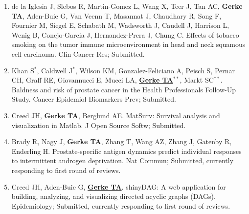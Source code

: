 \documentclass[11pt, a4paper]{article} %
\begin{document}
\begin{enumerate}[leftmargin=*]
\item{} de la Iglesia J, Slebos R, Martin-Gomez L, Wang X, Teer J, Tan AC, {\bf Gerke TA}, Aden-Buie G, Van Veenn T, Masannat J, Chaudhary R, Song F, Fournier M, Siegel E, Schabath M, Wadsworth J, Caudell J, Harrison L, Wenig B, Conejo-Garcia J, Hernandez-Prera J, Chung C. Effects of tobacco smoking on the tumor immune microenvironment in head and neck squamous cell carcinoma. Clin Cancer Res; Submitted.

\item{} Khan S$^*$, Caldwell J$^*$, Wilson KM, Gonzalez-Feliciano A, Peisch S, Pernar CH, Graff RE, Giovannucci E, Mucci LA, \underline{{\bf Gerke TA$^{**}$}}, Markt SC$^{**}$. Baldness and risk of prostate cancer in the Health Professionals Follow-Up Study. Cancer Epidemiol Biomarkers Prev; Submitted.

\item{} Creed JH, {\bf Gerke TA}, Berglund AE. MatSurv: Survival analysis and visualization in Matlab. J Open Source Softw; Submitted.

\item{} Brady R, Nagy J, {\bf Gerke TA}, Zhang T, Wang AZ, Zhang J, Gatenby R, Enderling H. Prostate-specific antigen dynamics predict individual responses to intermittent androgen deprivation. Nat Commun; Submitted, currently responding to first round of reviews.

\item{} Creed JH, Aden-Buie G, \underline{{\bf Gerke TA}}. shinyDAG: A web application for building, analyzing, and visualizing directed acyclic graphs (DAGs). Epidemiology; Submitted, currently responding to first round of reviews. 

\end{enumerate}
\end{document}

